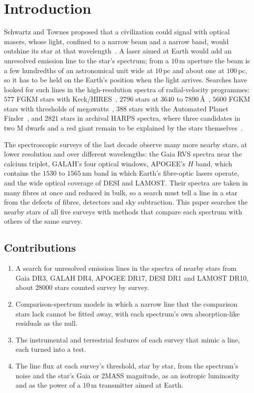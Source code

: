 \documentclass[3p,11pt]{elsarticle}
\begin{document}
\section{Introduction}\label{sec:intro}

Schwartz and Townes proposed that a civilization could signal with optical masers, whose
light, confined to a narrow beam and a narrow band, would outshine its star at that
wavelength~\cite{SchwartzTownes1961}. A laser aimed at Earth would add an unresolved
emission line to the star's spectrum; from a $10$\,m aperture the beam is a few
hundredths of an astronomical unit wide at $10$\,pc and about one at $100$\,pc, so it
has to be held on the Earth's position when the light arrives. Searches have looked for
such lines in the high-resolution spectra of radial-velocity programmes: $577$ FGKM
stars with Keck/HIRES~\cite{ReinesMarcy2002}, $2796$ stars at $3640$ to
$7890$\,\AA~\cite{TellisMarcy2015}, $5600$ FGKM stars with thresholds of
megawatts~\cite{TellisMarcy2017}, $388$ stars with the Automated Planet
Finder~\cite{Zuckerman2023}, and $2821$ stars in archival HARPS spectra, where three
candidates in two M dwarfs and a red giant remain to be explained by the stars
themselves~\cite{FieldsGoodman2025}.

The spectroscopic surveys of the last decade observe many more nearby stars, at lower
resolution and over different wavelengths: the Gaia RVS spectra near the calcium triplet,
GALAH's four optical windows, APOGEE's $H$ band, which contains the $1530$ to $1565$\,nm
band in which Earth's fibre-optic lasers operate, and the wide optical coverage of DESI
and LAMOST. Their spectra are taken in many fibres at once and reduced in bulk, so a
search must tell a line in a star from the defects of fibres, detectors and sky
subtraction. This paper searches the nearby stars of all five surveys with methods that
compare each spectrum with others of the same survey.

\subsection{Contributions}
\begin{enumerate}[leftmargin=*,itemsep=1pt]
\item A search for unresolved emission lines in the spectra of nearby stars from Gaia
DR3, GALAH DR4, APOGEE DR17, DESI DR1 and LAMOST DR10, about $28000$ stars counted
survey by survey.
\item Comparison-spectrum models in which a narrow line that the comparison stars lack
cannot be fitted away, with each spectrum's own absorption-like residuals as the null.
\item The instrumental and terrestrial features of each survey that mimic a line, each
turned into a test.
\item The line flux at each survey's threshold, star by star, from the spectrum's noise
and the star's Gaia or 2MASS magnitude, as an isotropic luminosity and as the power of a
$10$\,m transmitter aimed at Earth.
\end{enumerate}
\end{document}
